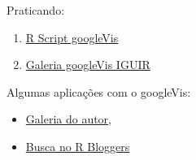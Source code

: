 \begin{frame}

 Praticando:
  \begin{enumerate}
  \item \href{run:./R/googleVis/googleVis.R}{R Script googleVis}
  \item \href{run:googleVis.html}{Galeria googleVis IGUIR}
  \end{enumerate}

  \vspace{0.5cm}
  Algumas aplicações com o googleVis:
  \begin{itemize}
  \item \href{http://cran.r-project.org/web/packages/googleVis/vignettes/}{Galeria
      do autor},
  \item \href{http://www.r-bloggers.com/?s=googleVis}{Busca no R
      Bloggers}
  \end{itemize}

\end{frame}
